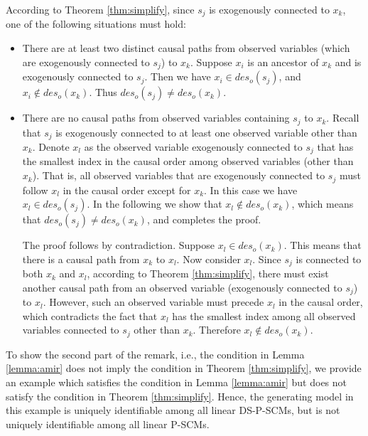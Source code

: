 \documentclass[12pt]{article}
\begin{document}
According to Theorem \ref{thm:simplify}, since $s_j$ is exogenously connected to $x_k$, one of the following situations must hold:
\begin{itemize}
    \item There are at least two distinct causal paths from observed variables (which are exogenously connected to $s_j$) to $x_k$. Suppose $x_i$ is an ancestor of $x_k$ and is exogenously connected to $s_j$. Then we have $x_i\in des_o(s_j)$, and $x_i\not\in des_o(x_k)$. Thus $des_o(s_j)\neq des_o(x_k)$.
    
    \item There are no causal paths from observed variables containing $s_j$ to $x_k$. Recall that $s_j$ is exogenously connected to at least one observed variable other than $x_k$. Denote $x_l$ as the observed variable exogenously connected to $s_j$ that has the smallest index in the causal order among observed variables (other than $x_k$). That is, all observed variables that are exogenously connected to $s_j$ must follow $x_l$ in the causal order except for $x_k$. In this case we have $x_l\in des_o(s_j)$. In the following we show that $x_l\not\in des_o(x_k)$, which means that $des_o(s_j)\neq des_o(x_k)$, and completes the proof.
    
    The proof follows by contradiction. Suppose $x_l \in des_o(x_k)$. This means that there is a causal path from $x_k$ to $x_l$. Now consider $x_l$. Since $s_j$ is connected to both $x_k$ and $x_l$, according to Theorem \ref{thm:simplify}, there must exist another causal path from an observed variable (exogenously connected to $s_j$) to $x_l$. However, such an observed variable must precede $x_l$ in the causal order, which contradicts the fact that $x_l$ has the smallest index among all observed variables connected to $s_j$ other than $x_k$. Therefore $x_l\not\in des_o(x_k)$.
    
\end{itemize}

To show the second part of the remark, i.e., the condition in Lemma \ref{lemma:amir} does not imply the condition in Theorem \ref{thm:simplify}, we provide an example which satisfies the condition in Lemma \ref{lemma:amir} but does not satisfy the condition in Theorem \ref{thm:simplify}. Hence, the generating model in this example is uniquely identifiable among all linear DS-P-SCMs, but is not uniquely identifiable among all linear P-SCMs.
\end{document}

